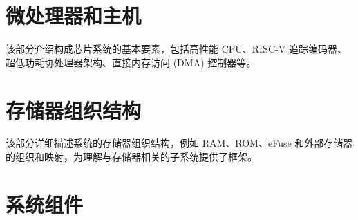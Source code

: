\documentclass[openany, 10pt]{book}
\begin{document}
\setchineseformatting




\clearpage

\clearpage


\tableofcontents
\clearpage
\listoftables
\clearpage
\listoffigures






\part{微处理器和主机}


该部分介绍构成芯片系统的基本要素，包括高性能 CPU、RISC-V 追踪编码器、超低功耗协处理器架构、直接内存访问 (DMA) 控制器等。


\part{存储器组织结构}

该部分详细描述系统的存储器组织结构，例如 RAM、ROM、eFuse 和外部存储器的组织和映射，为理解与存储器相关的子系统提供了框架。


\part{系统组件}

\end{document}
